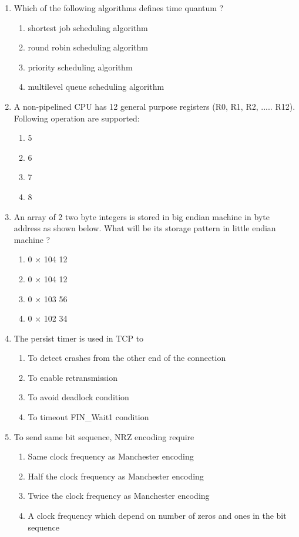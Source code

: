 \documentclass[12pt]{article}
\begin{document}
\begin{enumerate}
\item[31.] Which of the following algorithms defines time quantum ?
\begin{enumerate}[label=\Alph*.]
  \item shortest job scheduling algorithm
  \item round robin scheduling algorithm
  \item priority scheduling algorithm
  \item multilevel queue scheduling algorithm
\end{enumerate}

\item[32.] A non-pipelined CPU has 12 general purpose registers (R0, R1, R2, ..... R12). Following operation are supported:
\begin{enumerate}[label=\Alph*.]
  \item 5
  \item 6
  \item 7
  \item 8
\end{enumerate}

\item[33.] An array of 2 two byte integers is stored in big endian machine in byte address as shown below. What will be its storage pattern in little endian machine ?
\begin{enumerate}[label=\Alph*.]
  \item 0 × 104 12
  \item 0 × 104 12
  \item 0 × 103 56
  \item 0 × 102 34
\end{enumerate}

\item[34.] The persist timer is used in TCP to
\begin{enumerate}[label=\Alph*.]
  \item To detect crashes from the other end of the connection
  \item To enable retransmission
  \item To avoid deadlock condition
  \item To timeout FIN\_Wait1 condition
\end{enumerate}

\item[35.] To send same bit sequence, NRZ encoding require
\begin{enumerate}[label=\Alph*.]
  \item Same clock frequency as Manchester encoding
  \item Half the clock frequency as Manchester encoding
  \item Twice the clock frequency as Manchester encoding
  \item A clock frequency which depend on number of zeros and ones in the bit sequence
\end{enumerate}


\end{enumerate}
\end{document}
